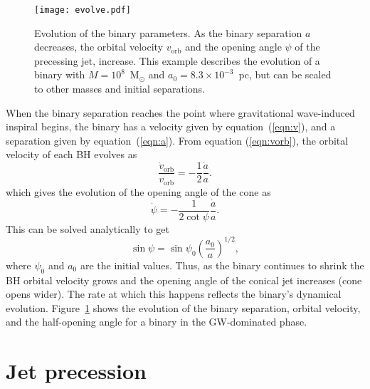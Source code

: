 \documentclass[a4paper,fleqn,usenatbib]{mnras}
\begin{document}
\begin{figure}
  \begin{center}
    \texttt{[image: evolve.pdf]}
  \end{center}
  \caption{Evolution of the binary parameters.  As the binary
    separation $a$ decreases, the orbital velocity $v_\mathrm{orb}$
    and the opening angle $\psi$ of the precessing jet, increase.
    This example describes the evolution of a binary with
    $M=10^8$~M$_\odot$ and $a_0=8.3\times 10^{-3}$~pc, but can be
    scaled to other masses and initial separations.}
  \label{fig:evolve}
\end{figure}

When the binary separation reaches the point where gravitational
wave-induced inspiral begins, the binary has a velocity given by
equation~(\ref{eqn:v}), and a separation given by
equation~(\ref{eqn:a}).  From equation (\ref{eqn:vorb}), the orbital
velocity of each BH evolves as
\begin{equation}
  \frac{\dot v_\mathrm{orb}}{v_\mathrm{orb}} = -\frac{1}{2}\frac{\dot a}{a}.
\end{equation}
which gives the evolution of the opening angle of the cone as 
\begin{equation}
 \dot\psi = -\frac{1}{2\cot\psi}\frac{\dot a}{a}.
\end{equation}
This can be solved analytically to get
\begin{equation}
  \sin\psi = \sin\psi_0\left(\frac{a_0}{a}\right)^{1/2},
\end{equation}
where $\psi_0$ and $a_0$ are the initial values. Thus, as the binary
continues to shrink the BH orbital velocity grows and the opening
angle of the conical jet increases (cone opens wider).  The rate at
which this happens reflects the binary's dynamical evolution.
Figure~\ref{fig:evolve} shows the evolution of the binary separation,
orbital velocity, and the half-opening angle for a binary in the
GW-dominated phase.

\section{Jet precession}
\end{document}
